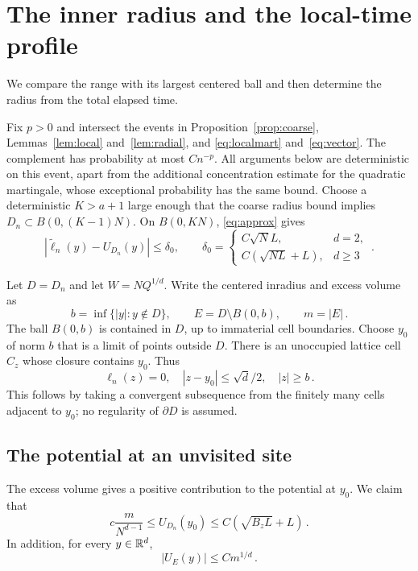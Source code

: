 \section{The inner radius and the local-time profile}\label{sec:contact}
We compare the range with its largest centered ball and then determine
the radius from the total elapsed time.

Fix $p>0$ and intersect the events in Proposition~\ref{prop:coarse},
Lemmas~\ref{lem:local} and~\ref{lem:radial}, and
\eqref{eq:localmart} and~\eqref{eq:vector}. The complement has probability
at most $Cn^{-p}$. All arguments below are deterministic on this event,
apart from the additional concentration estimate for the quadratic
martingale, whose exceptional probability has the same bound.
Choose a deterministic $K>a+1$ large enough that the coarse radius
bound implies $D_n\subset B(0,(K-1)N)$. On $B(0,KN)$,
\eqref{eq:approx} gives
\begin{equation}\label{eq:global}
|\widetilde\ell_n(y)-U_{D_n}(y)|\leq\delta_0 ,\qquad
\delta_0=\begin{cases}C\sqrt N L,&d=2,\\
C(\sqrt{NL}+L),&d\geq3
\end{cases}\, .
\end{equation}


Let $D=D_n$ and let $W=NQ^{1/d}$. Write the centered inradius and excess volume as
\begin{equation}\label{eq:bm}
 b=\inf\{|y|:y\notin D\},\qquad E=D\setminus B(0,b),\qquad m=|E|\, .
\end{equation}
The ball $B(0,b)$ is contained in $D$, up to immaterial cell boundaries.
Choose $y_0$ of norm $b$ that is a limit of points outside $D$.
There is an unoccupied lattice cell $C_z$ whose closure contains $y_0$.
Thus
\begin{equation}\label{eq:contactcell}
 \ell_n(z)=0,\quad |z-y_0|\leq\sqrt d/2,\quad |z|\geq b\, .
\end{equation}
This follows by taking a convergent subsequence from the finitely
many cells adjacent to $y_0$; no regularity of $\partial D$ is assumed.

\subsection{The potential at an unvisited site}
The excess volume gives a positive contribution to the potential at $y_0$.
We claim that
\begin{equation}\label{eq:contactbound}
c\frac{m}{N^{d-1}}\leq U_{D_n}(y_0)
\leq C(\sqrt{B_zL}+L)\, .
\end{equation}
In addition, for every $y\in\mathbb R^d$,
\begin{equation}\label{eq:packing}
|U_E(y)|\leq Cm^{1/d}\, .
\end{equation}

